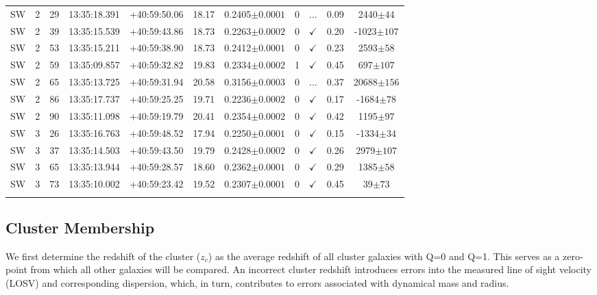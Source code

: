 \begin{landscape}
\begin{longtable}{ccccccccccc}
		SW & 2 & 29 & 13:35:18.391 & +40:59:50.06 & 18.17 & 0.2405$\pm{0.0001}$ & 0 & ... & 0.09 & 2440$\pm{44}$ \\
		SW & 2 & 39 & 13:35:15.539 & +40:59:43.86 & 18.73 & 0.2263$\pm{0.0002}$ & 0 & $\checkmark$ & 0.20 & -1023$\pm{107}$ \\
		SW & 2 & 53 & 13:35:15.211 & +40:59:38.90 & 18.73 & 0.2412$\pm{0.0001}$ & 0 & $\checkmark$ & 0.23 & 2593$\pm{58}$ \\
		SW & 2 & 59 & 13:35:09.857 & +40:59:32.82 & 19.83 & 0.2334$\pm{0.0002}$ & 1 & $\checkmark$ & 0.45 & 697$\pm{107}$ \\
		SW & 2 & 65 & 13:35:13.725 & +40:59:31.94 & 20.58 & 0.3156$\pm{0.0003}$ & 0 & ... & 0.37 & 20688$\pm{156}$ \\
		SW & 2 & 86 & 13:35:17.737 & +40:59:25.25 & 19.71 & 0.2236$\pm{0.0002}$ & 0 & $\checkmark$ & 0.17 & -1684$\pm{78}$ \\
		SW & 2 & 90 & 13:35:11.098 & +40:59:19.79 & 20.41 & 0.2354$\pm{0.0002}$ & 0 & $\checkmark$ & 0.42 & 1195$\pm{97}$ \\
		SW & 3 & 26 & 13:35:16.763 & +40:59:48.52 & 17.94 & 0.2250$\pm{0.0001}$ & 0 & $\checkmark$ & 0.15 & -1334$\pm{34}$ \\
		SW & 3 & 37 & 13:35:14.503 & +40:59:43.50 & 19.79 & 0.2428$\pm{0.0002}$ & 0 & $\checkmark$ & 0.26 & 2979$\pm{107}$ \\
		SW & 3 & 65 & 13:35:13.944 & +40:59:28.57 & 18.60 & 0.2362$\pm{0.0001}$ & 0 & $\checkmark$ & 0.29 & 1385$\pm{58}$ \\
		SW & 3 & 73 & 13:35:10.002 & +40:59:23.42 & 19.52 & 0.2307$\pm{0.0001}$ & 0 & $\checkmark$ & 0.45 & 39$\pm{73}$ \\
	\hline 
	\label{2tbl:MSJ133520.1+410004.1} 
	\end{longtable}
\end{landscape}

\subsection{Cluster Membership}\label{2sec:cluster membership} 
We first determine the redshift of the cluster ($z_c$) as the average redshift of all cluster galaxies with Q=0 and Q=1. This serves as a zero-point from which all other galaxies will be compared. An incorrect cluster redshift introduces errors into the measured line of sight velocity (LOSV) and corresponding dispersion, which, in turn, contributes to errors associated with dynamical mass and radius. 

